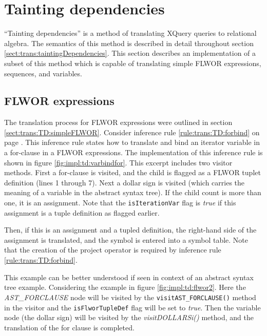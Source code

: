 \section{Tainting dependencies}
\label{sect:impl:tainting_deps}
``Tainting dependencies'' is a method of translating XQuery queries to
relational algebra. The semantics of this method is described in detail
throughout section \ref{sect:trans:taintingDependencies}. This section
describes an implementation of a subset of this method which is capable of
translating simple FLWOR expressions, sequences, and variables. 

\subsection{FLWOR expressions}
The translation process for FLWOR expressions were outlined in section
\ref{sect:trans:TD:simpleFLWOR}. Consider inference rule
\ref{rule:trans:TD:forbind} on page \pageref{rule:trans:TD:forbind}. This
inference rule states how to translate and bind an iterator variable in a
for-clause in a FLWOR expressions. The implementation of this inference rule is
shown in figure \ref{fig:impl:td:varbindfor}. This excerpt includes two visitor
methods. First a for-clause is visited, and the child is flagged as a FLWOR
tuplet definition (lines 1 through 7). Next a dollar sign is visited (which
carries the meaning of a variable in the abstract syntax tree). If the child
count is more than one, it is an assignment. Note that the
\texttt{isIterationVar} flag is \textit{true} if this assignment is a tuple
definition as flagged earlier.

Then, if this is an assignment and a tupled definition, the right-hand side of
the assignment is translated, and the symbol is entered into a symbol table.
Note that the creation of the project operator is required by inference rule
\ref{rule:trans:TD:forbind}.

This example can be better understood if seen in context of an abstract syntax
tree example. Considering the example in figure \ref{fig:impl:td:flwor2}. Here
the \textit{AST\_FORCLAUSE} node will be visited by the
\texttt{visitAST\_FORCLAUSE()} method in the visitor and the
\texttt{isFlworTupleDef} flag will be set to \textit{true}. Then the variable
node (the dollar sign) will be visited by the \textit{visitDOLLARSi()} method,
and the translation of the for clause is completed.

